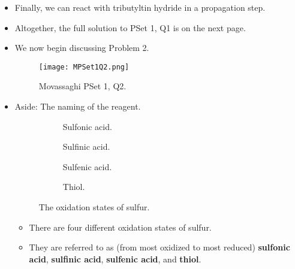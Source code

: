 \documentclass[../notes.tex]{subfiles}
\begin{document}
\begin{itemize}
    \item Finally, we can react with tributyltin hydride in a propagation step.
    \item Altogether, the full solution to PSet 1, Q1 is on the next page.
    
    \item We now begin discussing Problem 2.
    \begin{figure}[h!]
        \centering
        \texttt{[image: MPSet1Q2.png]}
        \caption{Movassaghi PSet 1, Q2.}
        \label{fig:MPSet1Q2}
    \end{figure}
    \item Aside: The naming of the reagent.
    \begin{figure}[h!]
        \centering
        \footnotesize
        \begin{subfigure}[b]{0.2\linewidth}
            \centering
            \caption{Sulfonic acid.}
            \label{fig:sulfurOxidationa}
        \end{subfigure}
        \begin{subfigure}[b]{0.2\linewidth}
            \centering
            \caption{Sulfinic acid.}
            \label{fig:sulfurOxidationb}
        \end{subfigure}
        \begin{subfigure}[b]{0.2\linewidth}
            \centering
            \caption{Sulfenic acid.}
            \label{fig:sulfurOxidationc}
        \end{subfigure}
        \begin{subfigure}[b]{0.2\linewidth}
            \centering
            \caption{Thiol.}
            \label{fig:sulfurOxidationd}
        \end{subfigure}
        \caption{The oxidation states of sulfur.}
        \label{fig:sulfurOxidation}
    \end{figure}
    \begin{itemize}
        \item There are four different oxidation states of sulfur.
        \item They are referred to as (from most oxidized to most reduced) \textbf{sulfonic acid}, \textbf{sulfinic acid}, \textbf{sulfenic acid}, and \textbf{thiol}.

\end{itemize}
\end{itemize}
\end{document}
